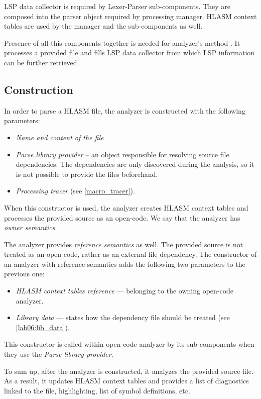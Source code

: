 LSP data collector is required by Lexer-Parser sub-components. They are composed into the parser object required by processing manager. HLASM context tables are used by the manager and the sub-components as well. 

Presence of all this components together is needed for analyzer's method . It processes a provided file and fills LSP data collector from which LSP information can be further retrieved.  

\subsection{Construction}

In order to parse a HLASM file, the analyzer is constructed with the following parameters:
\begin{itemize}
	\item \emph{Name and content of the file}
	\item \emph{Parse library provider} -- an object responsible for resolving source file dependencies. The dependencies are only discovered during the analysis, so it is not possible to provide the files beforehand.
	\item \emph{Processing tracer} (see \cref{macro_tracer}).
\end{itemize}

When this constructor is used, the analyzer creates HLASM context tables and processes the provided source as an open-code. We say that the analyzer has \emph{owner semantics}. 
 
The analyzer provides \emph{reference semantics} as well. The provided source is not treated as an open-code, rather as an external file dependency. The constructor of an analyzer with reference semantics adds the following two parameters to the previous one:
\begin{itemize}
	\item \emph{HLASM context tables reference} --- belonging to the owning open-code analyzer.
	\item \emph{Library data} --- states how the dependency file should be treated (see \cref{lab06:lib_data}).
\end{itemize}

This constructor is called within open-code analyzer by its sub-components when they use the \emph{Parse library provider}.

\vspace{0.5cm}

To sum up, after the analyzer is constructed, it analyzes the provided source file. As a result, it updates HLASM context tables and provides a list of diagnostics linked to the file, highlighting, list of symbol definitions, etc.
